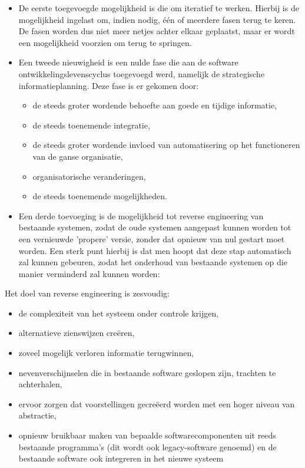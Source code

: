 \begin{itemize}
    \item De eerste toegevoegde mogelijkheid is die om iteratief te werken. Hierbij is de mogelijkheid ingelast om, indien nodig, één of meerdere fasen terug te keren. De fasen worden dus niet meer netjes achter elkaar geplaatst, maar er wordt een mogelijkheid voorzien om terug te springen.
    \item Een tweede nieuwigheid is een nulde fase die aan de software ontwikkelingslevenscyclus toegevoegd werd, namelijk de strategische informatieplanning. Deze fase is er gekomen door:
        \begin{itemize}
        \item de steeds groter wordende behoefte aan goede en tijdige informatie,
        \item de steeds toenemende integratie,
        \item de steeds groter wordende invloed van automatisering op het functioneren van de ganse organisatie,
        \item organisatorische veranderingen,
        \item de steeds toenemende mogelijkheden.
        \end{itemize}
    \item Een derde toevoeging is de mogelijkheid tot reverse engineering van bestaande systemen, zodat de oude systemen aangepast kunnen worden tot een vernieuwde 'propere' versie, zonder dat opnieuw van nul gestart moet worden. Een sterk punt hierbij is dat men hoopt dat deze stap automatisch zal kunnen gebeuren, zodat het onderhoud van bestaande systemen op die manier verminderd zal kunnen worden:
\end{itemize}

Het doel van reverse engineering is zesvoudig:

\begin{itemize}
    \item de complexiteit van het systeem onder controle krijgen,
    \item alternatieve zienswijzen creëren,
    \item zoveel mogelijk verloren informatie terugwinnen,
    \item nevenverschijnselen die in bestaande software geslopen zijn, trachten te achterhalen,
    \item ervoor zorgen dat voorstellingen gecreëerd worden met een hoger niveau van abstractie,
    \item opnieuw bruikbaar maken van bepaalde softwarecomponenten uit reeds bestaande programma's (dit wordt ook legacy-software genoemd) en de bestaande software ook integreren in het nieuwe systeem
\end{itemize}

